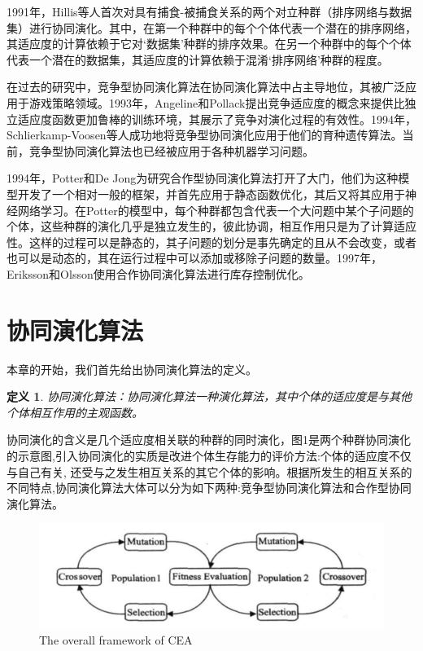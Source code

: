 \documentclass[a4paper]{article}
\newtheorem{definition}{\hspace{2em}定义}
\begin{document}
    1991年，Hillis等人首次对具有捕食-被捕食关系的两个对立种群（排序网络与数据集）进行协同演化\cite{hillis1990co}。其中，在第一个种群中的每个个体代表一个潜在的排序网络，其适应度的计算依赖于它对‘数据集’种群的排序效果。在另一个种群中的每个个体代表一个潜在的数据集，其适应度的计算依赖于混淆‘排序网络’种群的程度。
    
    在过去的研究中，竞争型协同演化算法在协同演化算法中占主导地位，其被广泛应用于游戏策略领域\cite{rosin1995methods,pollack1998co}。1993年，Angeline和Pollack提出竞争适应度的概念来提供比独立适应度函数更加鲁棒的训练环境，其展示了竞争对演化过程的有效性。1994年，Schlierkamp-Voosen等人成功地将竞争型协同演化应用于他们的育种遗传算法。当前，竞争型协同演化算法也已经被应用于各种机器学习问题。
    
    1994年，Potter和De Jong为研究合作型协同演化算法打开了大门\cite{potter1994cooperative}，他们为这种模型开发了一个相对一般的框架，并首先应用于静态函数优化，其后又将其应用于神经网络学习。在Potter的模型中，每个种群都包含代表一个大问题中某个子问题的个体，这些种群的演化几乎是独立发生的，彼此协调，相互作用只是为了计算适应性。这样的过程可以是静态的，其子问题的划分是事先确定的且从不会改变，或者也可以是动态的，其在运行过程中可以添加或移除子问题的数量。1997年，Eriksson和Olsson使用合作协同演化算法进行库存控制优化。


    \newpage
    \section{协同演化算法}

    本章的开始，我们首先给出协同演化算法的定义。
    
    \begin{definition}
        协同演化算法：协同演化算法一种演化算法，其中个体的适应度是与其他个体相互作用的主观函数。
    \end{definition}

    协同演化的含义是几个适应度相关联的种群的同时演化，图1是两个种群协同演化的示意图,引入协同演化的实质是改进个体生存能力的评价方法:个体的适应度不仅与自己有关, 还受与之发生相互关系的其它个体的影响。根据所发生的相互关系的不同特点,协同演化算法大体可以分为如下两种:竞争型协同演化算法和合作型协同演化算法。

    \begin{figure}[H]
        \centering
        \includegraphics[width=0.8\linewidth]{./images/cea_framework.png}
        \caption{The overall framework of CEA}
        \label{fig:cea_framework}
    \end{figure}
\end{document}
